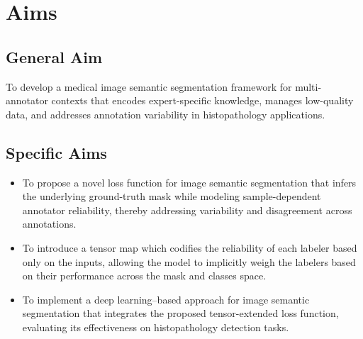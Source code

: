 
\section{Aims}\label{sec:objectives}

\subsection{General Aim}

To develop a medical image semantic segmentation framework for
multi-annotator contexts that encodes expert-specific knowledge,
manages low-quality data, and addresses annotation variability in
histopathology applications.

\subsection{Specific Aims}

\begin{itemize}

  \item To propose a novel loss function for image semantic
    segmentation that infers the underlying ground-truth mask while
    modeling sample-dependent annotator reliability, thereby
    addressing variability and disagreement across annotations.

  \item To introduce a tensor map which codifies the reliability of
    each labeler based only on the inputs, allowing the model to
    implicitly weigh the labelers based on their performance across
    the mask and classes space.

  \item To implement a deep learning–based approach for image
    semantic segmentation that integrates the proposed
    tensor-extended loss function, evaluating its effectiveness on
    histopathology detection tasks.

\end{itemize}
